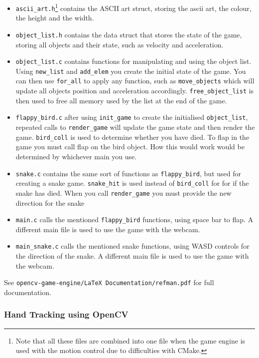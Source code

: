 \documentclass[10pt]{article}
\begin{document}
\begin{itemize}
\item \texttt{ascii\_art.h}\footnote{Note that all these files are combined into one file when the game engine is used with the motion control due to difficulties with CMake.} contains the ASCII art struct, storing the ascii art, the colour, the height and the width.
\item \texttt{object\_list.h} contains the data struct that stores the state of the game, storing all objects and their state, such as velocity and acceleration.
\item \texttt{object\_list.c} contains functions for manipulating and using the object list. Using \texttt{new\_list} and \texttt{add\_elem} you create the initial state of the game. You can then use \texttt{for\_all} to apply any function, such as \texttt{move\_objects} which will update all objects position and acceleration accordingly. \texttt{free\_object\_list} is then used to free all memory used by the list at the end of the game.
\item \texttt{flappy\_bird.c} after using \texttt{init\_game} to create the initialised \texttt{object\_list}, repeated calls to \texttt{render\_game} will update the game state and then render the game. \texttt{bird\_coll} is used to determine whether you have died. To flap in the game you must call flap on the bird object. How this would work would be determined by whichever main you use.
\item \texttt{snake.c} contains the same sort of functions as \texttt{flappy\_bird}, but used for creating a snake game. \texttt{snake\_hit} is used instead of \texttt{bird\_coll} for for if the snake has died. When you call \texttt{render\_game} you must provide the new direction for the snake 
\item \texttt{main.c} calls the mentioned \texttt{flappy\_bird} functions, using space bar to flap. A different main file is used to use the game with the webcam.
\item \texttt{main\_snake.c} calls the mentioned snake functions, using WASD controls for the direction of the snake. A different main file is used to use the game with the webcam.
\end{itemize}

See \texttt{opencv-game-engine/LaTeX Documentation/refman.pdf} for full documentation.

\subsubsection{Hand Tracking using OpenCV}
\end{document}
